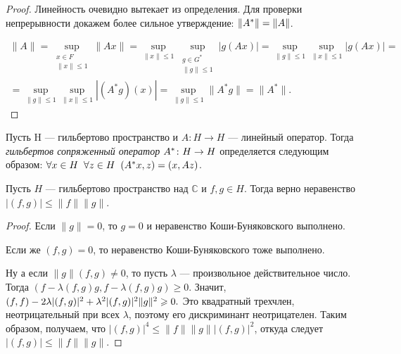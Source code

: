 \documentclass[10pt,titlepage, a4paper]{article}
\begin{document}
\begin{proof}
Линейность очевидно вытекает из определения. Для проверки
непрерывности докажем более сильное утверждение: $\|A^*\|\p=\|A\|$.

\begin{multline*}
\|A\|=\sup\limits_{\substack{x\in F\\ \|x\|\leqslant
1}}\|Ax\|=\sup\limits_{\|x\|\leqslant 1}\sup\limits_{\substack{g\in
G^*\\ \|g\|\leqslant 1}}|g(Ax)|=\sup\limits_{\|g\|\leqslant
1}\sup\limits_{\|x\|\leqslant 1}|g(Ax)|=\\
=\sup\limits_{\|g\|\leqslant 1}\sup\limits_{\|x\|\leqslant
1}|(A^*g)(x)|=\sup\limits_{\|g\|\leqslant 1}\|A^*g\|=\|A^*\|.
\end{multline*}
\end{proof}

\begin{defen}
Пусть H --- гильбертово пространство и $A\colon H\rightarrow H$
--- линейный оператор. Тогда \emph{гильбертов сопряженный оператор}
$A^*\colon H\p\rightarrow H$ определяется следующим образом:
$\forall x\in H \;\;\forall z\in H \;\;(A^*x,z)\p=(x,Az)$.
\end{defen}

\clearpage

\lecture

\begin{theorem}\label{th.kompl.Koshi} Пусть $H$ --- гильбертово пространство
над $\mathbb{C}$ и $f,g\in H$. Тогда верно неравенство
$|(f,g)|\leqslant \|f\|\|g\|$.
\end{theorem}

\begin{proof}
Если $\|g\|=0$, то $g=0$ и неравенство Коши-Буняковс\-кого
выполнено.

Если же $(f,g)=0$, то неравенство Коши-Буняковского тоже выполнено.

Ну а если $\|g\|(f,g)\neq0$, то пусть $\lambda$ --- произвольное
действительное число. Тогда
$(f-\lambda(f,g)g,f-\lambda(f,g)g)\geqslant 0.$ Значит,
$(f,f)-2\lambda|(f,g)|^2\p+\lambda^2|(f,g)|^2\|g\|^2\geqslant0.$ Это
квадратный трехчлен, неотрицательный при всех $\lambda$, поэтому его
дискриминант неотрицателен. Таким образом, получаем, что
$|(f,g)|^4\leqslant \|f\|\|g\||(f,g)|^2$, откуда следует
$|(f,g)|\leqslant \|f\|\|g\|.$
\end{proof}
\end{document}
